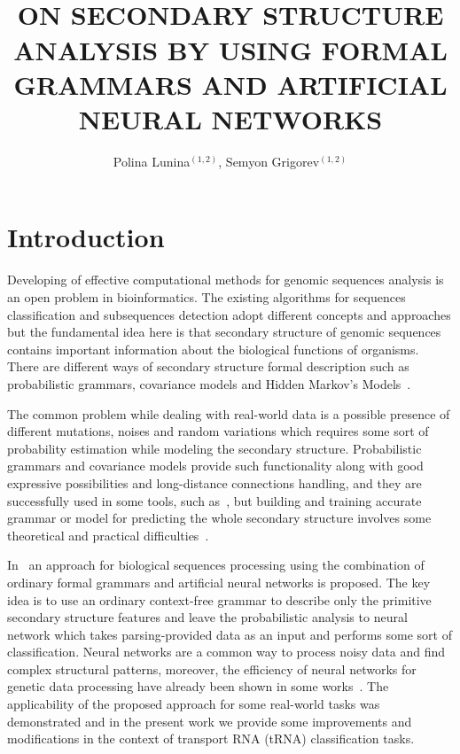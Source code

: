 \documentclass[12pt,a4paper]{cibb}
\title{\large $\ $\\ \bf ON SECONDARY STRUCTURE ANALYSIS BY USING FORMAL GRAMMARS AND ARTIFICIAL NEURAL NETWORKS}
\author{ Polina Lunina$^{(1,2)}$, Semyon Grigorev$^{(1,2)}$}
\begin{document}
\thispagestyle{myheadings}
\pagestyle{myheadings}



\section{\bf Introduction}

Developing of effective computational methods for genomic sequences analysis is an open problem in bioinformatics.
The existing algorithms for sequences classification and subsequences detection adopt different concepts and approaches but the fundamental idea here is that secondary structure of genomic sequences contains important information about the biological functions of organisms.
There are different ways of secondary structure formal description such as probabilistic grammars, covariance models and Hidden Markov’s Models~\cite{EddyDurbin,dowell2004evaluation,knudsen1999rna}.

The common problem while dealing with real-world data is a possible presence of different mutations, noises and random variations which requires some sort of probability estimation while modeling the secondary structure.
Probabilistic grammars and covariance models provide such functionality along with good expressive possibilities and long-distance connections handling, and they are successfully used in some tools, such as~\cite{Infernal}, but building and training accurate grammar or model for predicting the whole secondary structure involves some theoretical and practical difficulties~\cite{!!!}.

In~\cite{grigorevcomposition} an approach for biological sequences processing using the combination of ordinary formal grammars and artificial neural networks is proposed.
The key idea is to use an ordinary context-free grammar to describe only the primitive secondary structure features and leave the probabilistic analysis to neural network which takes parsing-provided data as an input and performs some sort of classification.
Neural networks are a common way to process noisy data and find complex structural patterns, moreover, the efficiency of neural networks for genetic data processing have already been shown in some works~\cite{Humidor,ANN}.
The applicability of the proposed approach for some real-world tasks was demonstrated and in the present work we provide some improvements and modifications in the context of transport RNA (tRNA) classification tasks.
\end{document}
